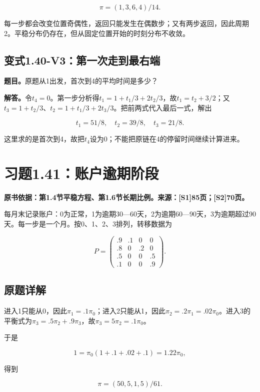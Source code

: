 \documentclass[
  11pt,
  a4paper,
  UTF8,
  fontset=fandol]{ctexart}
\begin{document}
\[
\boxed{\pi=(1,3,6,4)/14.}
\]

每一步都会改变位置奇偶性，返回只能发生在偶数步；又有两步返回，因此周期2。平稳分布仍存在，但从固定位置开始的时刻分布不收敛。

\subsection{变式1.40-V3：第一次走到最右端}\label{ux53d8ux5f0f1.40-v3ux7b2cux4e00ux6b21ux8d70ux5230ux6700ux53f3ux7aef}

\textbf{题目。}原题从1出发，首次到4的平均时间是多少？

\textbf{解答。}令\(t_4=0\)。第一步分析得\(t_1=1+t_1/3+2t_2/3\)，故\(t_1=t_2+3/2\)；又\(t_3=1+t_2/3\)、\(t_2=1+t_1/3+2t_3/3\)。把前两式代入最后一式，解出

\[
\boxed{t_1=51/8,\quad t_2=39/8,\quad t_3=21/8.}
\]

这里求的是首次到4，故把\(t_4\)设为0；不能把原链在4的停留时间继续计算进来。

\section{习题1.41：账户逾期阶段}\label{ux4e60ux98981.41ux8d26ux6237ux903eux671fux9636ux6bb5}

\textbf{原书依据：第1.4节平稳方程、第1.6节长期比例。来源：{[}S1{]}85页；{[}S2{]}70页。}

每月末记录账户：0为正常，1为逾期30---60天，2为逾期60---90天，3为逾期超过90天。每一步是一个月。按0、1、2、3排列，转移数据为

\[
P=\begin{pmatrix}
.9&.1&0&0\\.8&0&.2&0\\.5&0&0&.5\\.1&0&0&.9
\end{pmatrix}.
\]

\subsection{原题详解}\label{ux539fux9898ux8be6ux89e3-8}

进入1只能从0，因此\(\pi_1=.1\pi_0\)；进入2只能从1，因此\(\pi_2=.2\pi_1=.02\pi_0\)。进入3的平衡式为\(\pi_3=.5\pi_2+.9\pi_3\)，故\(\pi_3=5\pi_2=.1\pi_0\)。

于是

\[
1=\pi_0(1+.1+.02+.1)=1.22\pi_0,
\]

得到

\[
\boxed{\pi=(50,5,1,5)/61.}
\]
\end{document}
